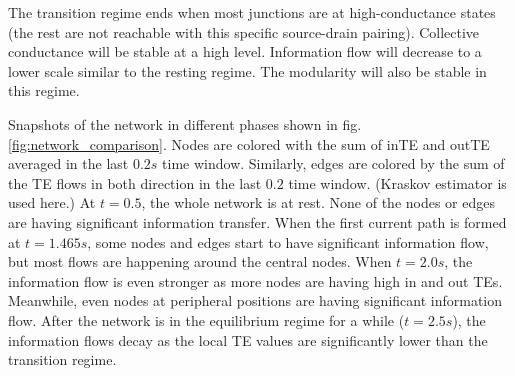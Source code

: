 \documentclass[%
 reprint,
 amsmath,amssymb,
 aps,
]{revtex4-2}
\begin{document}
The transition regime ends when most junctions are at high-conductance states (the rest are not reachable with this specific source-drain pairing). Collective conductance will be stable at a high level. Information flow will decrease to a lower scale similar to the resting regime. The modularity will also be stable in this regime.

Snapshots of the network in different phases shown in fig. \ref{fig:network_comparison}. Nodes are colored with the sum of inTE and outTE averaged in the last $0.2 s$ time window. Similarly, edges are colored by the sum of the TE flows in both direction in the last $0.2$ time window. (Kraskov estimator is used here.) At $t= 0.5$, the whole network is at rest. None of the nodes or edges are having significant information transfer. When the first current path is formed at $t = 1.465 s$, some nodes and edges start to have significant information flow, but most flows are happening around the central nodes. When $t = 2.0 s$, the information flow is even stronger as more nodes are having high in and out TEs. Meanwhile, even nodes at peripheral positions are having significant information flow. After the network is in the equilibrium regime for a while ($t = 2.5s$), the information flows decay as the local TE values are significantly lower than the transition regime.
\end{document}
